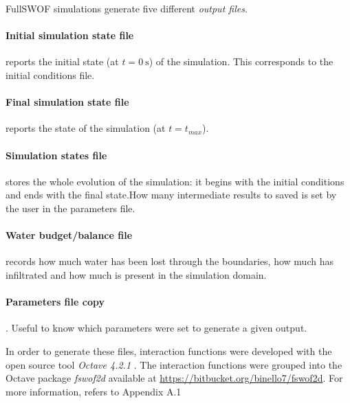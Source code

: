 FullSWOF simulations generate five different \emph{output files}.
\paragraph{Initial simulation state file} reports the initial state (at $t = \SI{0}{\s}$) of the simulation. 
This corresponds to the initial conditions file.
\paragraph{Final simulation state file} reports the state of the simulation (at $t = t_{max}$).
\paragraph{Simulation states file} stores the whole evolution of the simulation: it begins with the initial conditions and ends with the final state.How many intermediate results to saved is set by the user in the parameters file.
\paragraph{Water budget/balance file} records how much water has been lost through the boundaries, how much has infiltrated and how much is present in the simulation domain.
\paragraph{Parameters file copy}. Useful to know which parameters were set to generate a given output.

In order to generate these files, interaction functions were developed with the open source tool \textit{Octave 4.2.1} \autocite{octave_community_gnu_2018}. The interaction functions were grouped into the Octave package \textit{fswof2d} available at \url{https://bitbucket.org/binello7/fswof2d}. For more information, refers to  Appendix A.1


